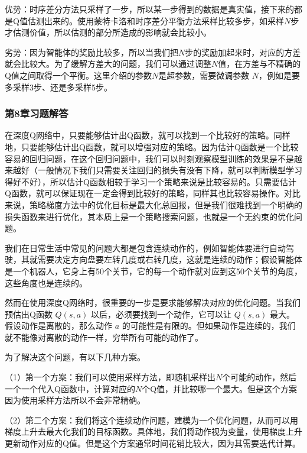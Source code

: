 
优势：时序差分方法只采样了一步，所以某一步得到的数据是真实值，接下来的都是Q值估测出来的。使用蒙特卡洛和时序差分平衡方法采样比较多步，如采样$N$步才估测价值，所以估测的部分所造成的影响就会比较小。

劣势：因为智能体的奖励比较多，所以当我们把$N$步的奖励加起来时，对应的方差就会比较大。为了缓解方差大的问题，我们可以通过调整$N$值，在方差与不精确的Q值之间取得一个平衡。这里介绍的参数$N$是超参数，需要微调参数 $N$，例如是要多采样3步、还是多采样5步。



\subsubsection*{第8章习题解答}


在深度Q网络中，只要能够估计出Q函数，就可以找到一个比较好的策略。同样地，只要能够估计出Q函数，就可以增强对应的策略。因为估计Q函数是一个比较容易的回归问题，在这个回归问题中，我们可以时刻观察模型训练的效果是不是越来越好（一般情况下我们只需要关注回归的损失有没有下降，就可以判断模型学习得好不好），所以估计Q函数相较于学习一个策略来说是比较容易的。只需要估计Q函数，就可以保证现在一定会得到比较好的策略，同样其也比较容易操作。对比来说，策略梯度方法中的优化目标是最大化总回报，但是我们很难找到一个明确的损失函数来进行优化，其本质上是一个策略搜索问题，也就是一个无约束的优化问题。


我们在日常生活中常见的问题大都是包含连续动作的，例如智能体要进行自动驾驶，其就需要决定方向盘要左转几度或右转几度，这就是连续的动作；假设智能体是一个机器人，它身上有50个关节，它的每一个动作就对应到这50个关节的角度，这些角度也是连续的。

然而在使用深度Q网络时，很重要的一步是要求能够解决对应的优化问题。当我们预估出Q函数 $Q(s,a)$ 以后，必须要找到一个动作，它可以让 $Q(s,a)$ 最大。假设动作是离散的，那么动作 $a$ 的可能性是有限的。但如果动作是连续的，我们就不能像对离散的动作一样，穷举所有可能的动作了。

为了解决这个问题，有以下几种方案。

（1）第一个方案：我们可以使用采样方法，即随机采样出$N$个可能的动作，然后一个一个代入Q函数中，计算对应的$N$个Q值，并比较哪一个最大。但是这个方案因为使用采样方法所以不会非常精确。

（2）第二个方案：我们将这个连续动作问题，建模为一个优化问题，从而可以用梯度上升去最大化我们的目标函数。具体地，我们将动作视为变量，使用梯度上升更新动作对应的Q值。但是这个方案通常时间花销比较大，因为其需要迭代计算。

